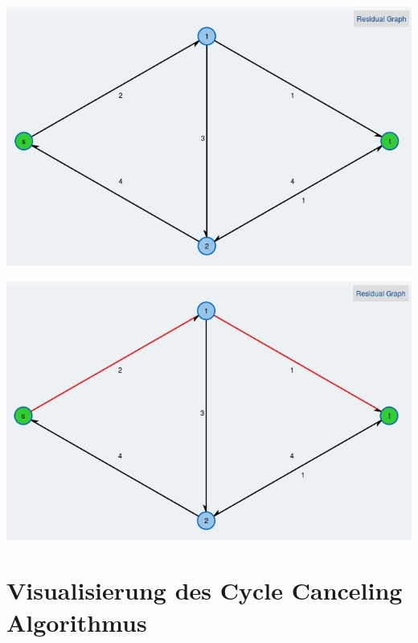 \begin{center}
\begin{minipage}[t]{0.58\textwidth}
    \includegraphics[width=\textwidth]{img/ford-fulkerson-2.jpg}
\end{minipage}
\end{center}


\begin{center}
\begin{minipage}[t]{0.58\textwidth}
    \includegraphics[width=\textwidth]{img/ford-fulkerson-3.jpg}
\end{minipage}
\end{center}


\section{Visualisierung des Cycle Canceling Algorithmus}

